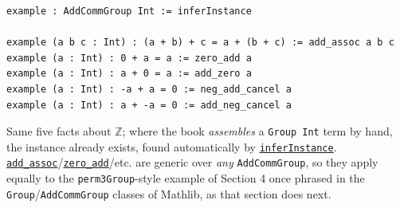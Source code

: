 \begin{lstlisting}
example : AddCommGroup Int := inferInstance

example (a b c : Int) : (a + b) + c = a + (b + c) := add_assoc a b c
example (a : Int) : 0 + a = a := zero_add a
example (a : Int) : a + 0 = a := add_zero a
example (a : Int) : -a + a = 0 := neg_add_cancel a
example (a : Int) : a + -a = 0 := add_neg_cancel a
\end{lstlisting}

Same five facts about \(\mathbb{Z}\); where the book \emph{assembles} a \texttt{Group Int} term by hand, the instance already exists, found automatically by \href{https://loogle.lean-lang.org/?q=inferInstance}{\texttt{inferInstance}}. \href{https://loogle.lean-lang.org/?q=add_assoc}{\texttt{add\_\allowbreak{}assoc}}/\href{https://loogle.lean-lang.org/?q=zero_add}{\texttt{zero\_\allowbreak{}add}}/etc. are generic over \emph{any} \texttt{AddCommGroup}, so they apply equally to the \texttt{perm3Group}-style example of Section 4 once phrased in the \texttt{Group}/\texttt{AddCommGroup} classes of Mathlib, as that section does next.
